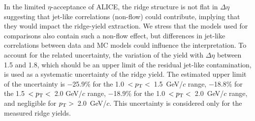 In the limited $\eta$-acceptance of ALICE, the ridge structure is not flat in $\Delta\eta$ suggesting that jet-like correlations (non-flow) could contribute, implying that they would impact the ridge-yield extraction. We stress that the models used for comparisons also contain such a non-flow effect, but differences in jet-like correlations between data and MC models could influence the interpretation. To account for the related uncertainty, the variation of the yield with $\Delta\eta$ between 1.5 and 1.8, which should be an upper limit of the residual jet-like contamination, is used as a systematic uncertainty of the ridge yield. The estimated upper limit of the uncertainty is $-$25.9\% for the 1.0~$<p_\mathrm{T}<$~1.5~GeV/$c$ range,  $-$18.8\% for the 1.5~$<p_\mathrm{T}<$~2.0 GeV/$c$ range,  $-$18.9\% for the 1.0~$<p_\mathrm{T}<$~2.0~GeV/$c$ range, and negligible for $p_\mathrm{T}>$~2.0~GeV/$c$. This uncertainty is considered only for the measured ridge yields.




